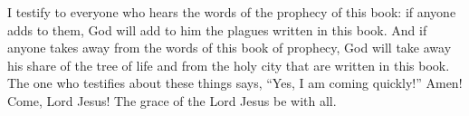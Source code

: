 \begin{biblechapter}
 I testify to everyone who hears the words of the prophecy of this book: if anyone adds to them, God will add to him the plagues written in this book.
\verse And if anyone takes away from the words of this book of prophecy, God will take away his share of the tree of life and from the holy city that are written in this book.
\verse The one who testifies about these things says, “Yes, I am coming quickly!” Amen! Come, Lord Jesus!
\verse The grace of the Lord Jesus be with all.
\end{biblechapter}

